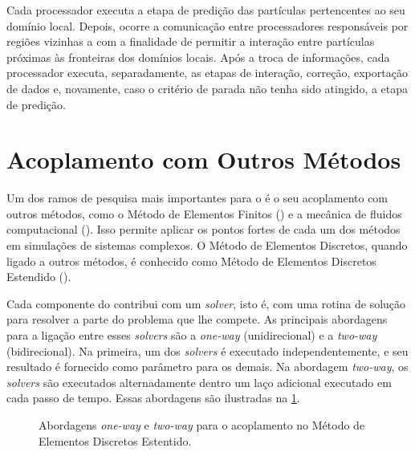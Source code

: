 Cada processador executa a etapa de predição das partículas pertencentes ao seu domínio local. Depois, ocorre a comunicação entre processadores responsáveis por regiões vizinhas a com a finalidade de permitir a interação entre partículas próximas às fronteiras dos domínios locais. Após a troca de informações, cada processador executa, separadamente, as etapas de interação, correção, exportação de dados e, novamente, caso o critério de parada não tenha sido atingido, a etapa de predição.

\section{Acoplamento com Outros Métodos} \label{sec:discrete_element_method:coupling_with_other_methods}

Um dos ramos de pesquisa mais importantes para o \DEM{} é o seu acoplamento com outros métodos, como o Método de Elementos Finitos (\FEM{}) e a mecânica de fluidos computacional (\CFD{}). Isso permite aplicar os pontos fortes de cada um dos métodos em simulações de sistemas complexos. O Método de Elementos Discretos, quando ligado a outros métodos, é conhecido como Método de Elementos Discretos Estendido (\XDEM{}).

Cada componente do \XDEM{} contribui com um \textit{solver}, isto é, com uma rotina de solução para resolver a parte do problema que lhe compete. As principais abordagens para a ligação entre esses \textit{solvers} são a \textit{one-way} (unidirecional) e a \textit{two-way} (bidirecional). Na primeira, um dos \textit{solvers} é executado independentemente, e seu resultado é fornecido como parâmetro para os demais. Na abordagem \textit{two-way}, os \textit{solvers} são executados alternadamente dentro um laço adicional executado em cada passo de tempo. Essas abordagens são ilustradas na \cref{fig:method_coupling:flowchart}.

\begin{figure}[h]
	\caption{Abordagens \textit{one-way} e \textit{two-way} para o acoplamento no Método de Elementos Discretos Estentido.}
	\centering
	\captionsetup[subfloat]{labelfont=bf}
	\label{fig:method_coupling:flowchart}
\end{figure}

